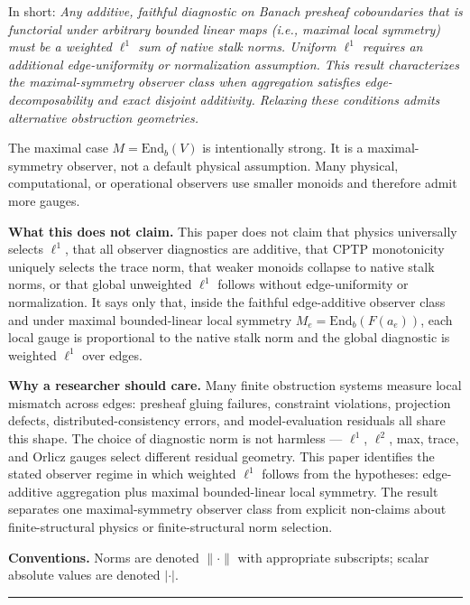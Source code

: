 \documentclass[
  11pt,
]{article}
\renewenvironment{quote}
  {\begin{leftbar}\small}
  {\end{leftbar}}
\begin{document}
In short: \emph{Any additive, faithful diagnostic on Banach presheaf coboundaries that is functorial under arbitrary bounded linear maps (i.e., maximal local symmetry) must be a weighted \(\ell^1\) sum of native stalk norms. Uniform \(\ell^1\) requires an additional edge-uniformity or normalization assumption. This result characterizes the maximal-symmetry observer class when aggregation satisfies edge-decomposability and exact disjoint additivity. Relaxing these conditions admits alternative obstruction geometries.}

The maximal case \(M=\mathrm{End}_b(V)\) is intentionally strong. It is a maximal-symmetry observer, not a default physical assumption. Many physical, computational, or operational observers use smaller monoids and therefore admit more gauges.

\begin{quote}
\textbf{What this does not claim.} This paper does not claim that physics universally selects \(\ell^1\), that all observer diagnostics are additive, that CPTP monotonicity uniquely selects the trace norm, that weaker monoids collapse to native stalk norms, or that global unweighted \(\ell^1\) follows without edge-uniformity or normalization. It says only that, inside the faithful edge-additive observer class and under maximal bounded-linear local symmetry \(M_e = \mathrm{End}_b(F(a_e))\), each local gauge is proportional to the native stalk norm and the global diagnostic is weighted \(\ell^1\) over edges.

\textbf{Why a researcher should care.} Many finite obstruction systems measure local mismatch across edges: presheaf gluing failures, constraint violations, projection defects, distributed-consistency errors, and model-evaluation residuals all share this shape. The choice of diagnostic norm is not harmless --- \(\ell^1\), \(\ell^2\), max, trace, and Orlicz gauges select different residual geometry. This paper identifies the stated observer regime in which weighted \(\ell^1\) follows from the hypotheses: edge-additive aggregation plus maximal bounded-linear local symmetry. The result separates one maximal-symmetry observer class from explicit non-claims about finite-structural physics or finite-structural norm selection.
\end{quote}

\textbf{Conventions.} Norms are denoted \(\lVert \cdot \rVert\) with appropriate subscripts; scalar absolute values are denoted \(|\cdot|\).

\begin{center}\rule{0.5\linewidth}{0.5pt}\end{center}
\end{document}
